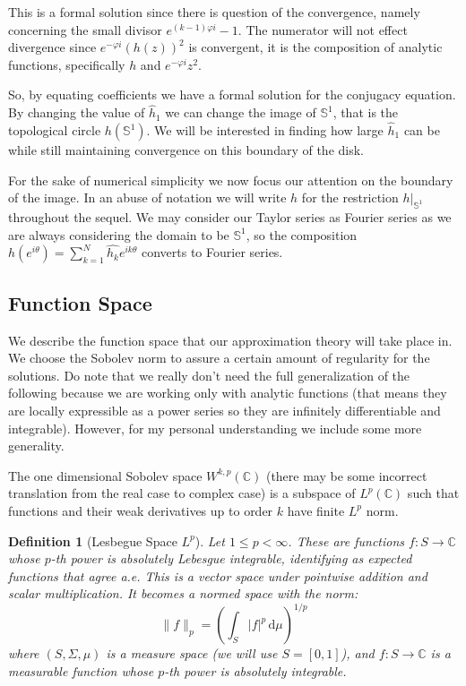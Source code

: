 \documentclass{article}
\newcommand{\C}{\mathbb{C}}
\newcommand{\s}{\mathbb{S}^1}
\theoremstyle{plain}
\newtheorem*{dfn}{Definition}
\theoremstyle{remark}
\begin{document}
This is a formal solution since there is question of the convergence, namely concerning the small divisor $e^{(k-1)\varphi i}-1$. 
The numerator will not effect divergence since $e^{-\varphi i}(h(z))^2$ is convergent, it is the composition of analytic functions, specifically $h$ and $e^{-\varphi i} z^2$. 

So, by equating coefficients we have a formal solution for the conjugacy equation. 
By changing the value of $\hat{h}_1$ we can change the image of $\s$, that is the topological circle $h(\s)$. 
We will be interested in finding how large $\hat{h}_1$ can be while still maintaining convergence on this boundary of the disk. 

For the sake of numerical simplicity we now focus our attention on the boundary of the image. 
In an abuse of notation we will write $h$ for the restriction $h|_{\s}$ throughout the sequel. 
We may consider our Taylor series as Fourier series as we are always considering the domain to be $\s$, so the composition $h\left(e^{i\theta}\right) = \sum_{k=1}^N \hat{h_k} e^{ik\theta}$ converts to Fourier series.

\subsection{Function Space}\label{sec:sobolevNorms}

We describe the function space that our approximation theory will take place in. 
We choose the Sobolev norm to assure a certain amount of regularity for the solutions. 
Do note that we really don't need the full generalization of the following because we are working only with analytic functions (that means they are locally expressible as a power series so they are infinitely differentiable and integrable). 
However, for my personal understanding we include some more generality. 

The one dimensional Sobolev space $W^{k,p}(\C)$ (there may be some incorrect translation from the real case to complex case) is a subspace of $L^p(\C)$ such that functions and their weak derivatives up to order $k$ have finite $L^p$ norm. 

\begin{dfn}[Lesbegue Space $L^p$]
Let $1 \leq p < \infty$. 
These are functions $f : S \to \C$ whose $p$-th power is absolutely Lebesgue integrable, identifying as expected functions that agree a.e. 
This is a vector space under pointwise addition and scalar multiplication. 
It becomes a normed space with the norm:
\begin{equation*}
\|f\|_p = \left( \int_S |f|^p \, \mathrm{d}\mu \right)^{1/p}
\end{equation*}
where $(S, \Sigma, \mu)$ is a measure space (we will use $S = [0,1]$), and $f : S \to \C$ is a measurable function whose $p$-th power is absolutely integrable. 
\end{dfn}
\end{document}
